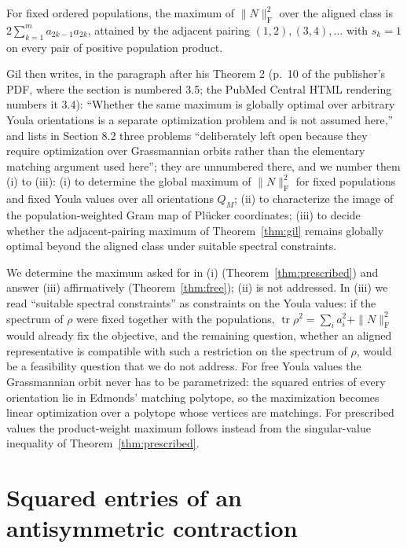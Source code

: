 \documentclass[11pt]{article}
\newcommand{\F}{\mathrm F}
\DeclareMathOperator{\tr}{tr}
\begin{document}
\begin{theorem}\label{thm:gil}
For fixed ordered populations, the maximum of $\|N\|_\F^2$ over the aligned
class is $2\sum_{k=1}^{m}a_{2k-1}a_{2k}$, attained by the adjacent pairing
$(1,2),(3,4),\dots$ with $s_k=1$ on every pair of positive population product.
\end{theorem}

Gil then writes, in the paragraph after his Theorem 2 (p.~10 of the publisher's PDF, where the section is numbered 3.5; the PubMed Central HTML rendering numbers it 3.4): ``Whether the same maximum is globally optimal
over arbitrary Youla orientations is a separate optimization problem and is
not assumed here,'' and lists in Section 8.2 three problems ``deliberately
left open because they require optimization over Grassmannian orbits rather
than the elementary matching argument used here''; they are unnumbered there,
and we number them (i) to (iii): (i) to determine the global maximum of
$\|N\|_\F^2$ for fixed populations and fixed Youla values over all
orientations $Q_M$; (ii) to characterize the image of the population-weighted
Gram map of Pl\"ucker coordinates; (iii) to decide whether the adjacent-pairing
maximum of Theorem~\ref{thm:gil} remains globally optimal beyond the aligned
class under suitable spectral constraints.

We determine the maximum asked for in (i) (Theorem~\ref{thm:prescribed}) and
answer (iii) affirmatively (Theorem~\ref{thm:free}); (ii) is not addressed. In
(iii) we read ``suitable spectral constraints'' as constraints on the Youla
values: if the spectrum of $\rho$ were fixed together with the populations,
$\tr\rho^2=\sum_ia_i^2+\|N\|_\F^2$ would already fix the objective, and the
remaining question, whether an aligned representative is compatible with such
a restriction on the spectrum of $\rho$, would be a feasibility question that
we do not address. For free Youla values the Grassmannian orbit never has to be parametrized:
the squared entries of every orientation lie in Edmonds' matching polytope,
so the maximization becomes linear optimization over a polytope whose
vertices are matchings. For prescribed values the product-weight maximum
follows instead from the singular-value inequality of
Theorem~\ref{thm:prescribed}.

\section{Squared entries of an antisymmetric contraction}
\end{document}
